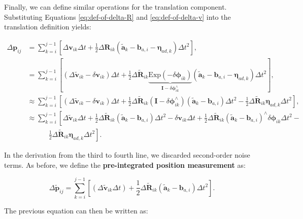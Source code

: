 Finally, we can define similar operations for the translation component. Substituting Equations \eqref{eq:def-of-delta-R} and \eqref{eq:def-of-delta-v} into the translation definition yields:

\begin{equation}
	\begin{aligned}
		\Delta \bm{p}_{ij} &= \sum_{k=i}^{j-1} \left[\Delta \bm{v}_{ik} \Delta t+\frac{1}{2} \Delta 
		\bm{R}_{ik}  \left(\tilde{\bm{a}}_k - \bm{b}_{a,i} - \boldsymbol{\eta}_{ad, k} \right)\Delta t^2 \right], \\
		&= \sum_{k=i}^{j-1} \left[(\Delta \tilde{\bm{v}}_{ik} - \delta \bm{v}_{ik}) \Delta t + \frac{1}{2} \Delta 
		\tilde{\bm{R}}_{ik} \underbrace{\mathrm{Exp}(-\delta \boldsymbol{\phi}_{ik})}_{\bm{I} - \delta 
			\boldsymbol{\phi}_{ik}^\wedge} \left(\tilde{\bm{a}}_k - \bm{b}_{a,i} - \boldsymbol{\eta}_{ad, k} 
		\right)\Delta t^2 \right], \\
		&\approx \sum_{k=i}^{j-1} \left[ (\Delta \tilde{\bm{v}}_{ik} - \delta \bm{v}_{ik}) \Delta t +  \frac{1}{2} 
		\Delta \tilde{\bm{R}}_{ik} (\bm{I} - \delta \boldsymbol{\phi}^\wedge_{ik}) (\tilde{\bm{a}}_k - 
		\bm{b}_{a,i}) \Delta t^2 - \frac{1}{2}\Delta \tilde{\bm{R}}_{ik} \boldsymbol{\eta}_{ad, k} \Delta t^2 
		\right], \\
		&\approx \sum_{k=i}^{j-1} \left[ \Delta \tilde{\bm{v}}_{ik} \Delta t + \frac{1}{2}\Delta 
		\tilde{\bm{R}}_{ik} (\tilde{\bm{a}}_k - \bm{b}_{a,i}) \Delta t^2 -\delta \bm{v}_{ik} \Delta t + 
		\frac{1}{2}\Delta \tilde{\bm{R}}_{ik} (\tilde{\bm{a}}_k - \bm{b}_{a,i})^\wedge \delta 
		\boldsymbol{\phi}_{ik} \Delta t^2 - \right. \\
		& \quad \quad \quad \left. \frac{1}{2} \Delta \tilde{\bm{R}}_{ik} \boldsymbol{\eta}_{ad, k} \Delta t^2  
		\right].
	\end{aligned}
\end{equation}

In the derivation from the third to fourth line, we discarded second-order noise terms. As before, we define the \textbf{pre-integrated position measurement} as:

\begin{equation}
	\Delta \tilde{\bm{p}}_{ij} = \sum_{k=i}^{j-1} \left[ (\Delta \tilde{\bm{v}}_{ik} \Delta t) + 
	\frac{1}{2}\Delta \tilde{\bm{R}}_{ik} (\tilde{\bm{a}}_k - \bm{b}_{a,i}) \Delta t^2 \right].
\end{equation}

The previous equation can then be written as:

